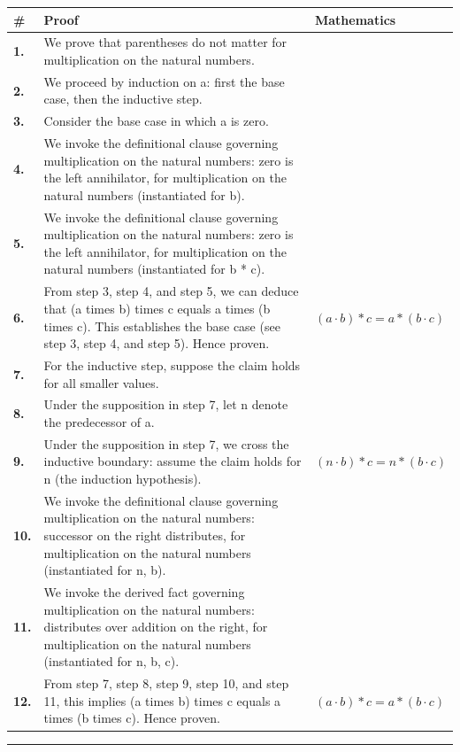 \documentclass[11pt]{article}
\theoremstyle{definition}
\begin{document}
\begin{tabular}{@{} >{\raggedright\arraybackslash}p{} >{\raggedright\arraybackslash}p{} >{\raggedleft\arraybackslash}p{} @{}}
\textbf{\#} & \textbf{Proof} & \textbf{Mathematics} \\
\midrule
\textbf{1.} & We prove that parentheses do not matter for multiplication on the natural numbers. & \\[0.45em]
\textbf{2.} & We proceed by induction on a: first the base case, then the inductive step. & \\[0.45em]
\textbf{3.} & Consider the base case in which a is zero. & \\[0.45em]
\textbf{4.} & We invoke the definitional clause governing multiplication on the natural numbers: zero is the left annihilator, for multiplication on the natural numbers (instantiated for b). & \\[0.45em]
\textbf{5.} & We invoke the definitional clause governing multiplication on the natural numbers: zero is the left annihilator, for multiplication on the natural numbers (instantiated for b * c). & \\[0.45em]
\textbf{6.} & From step 3, step 4, and step 5, we can deduce that (a times b) times c equals a times (b times c). This establishes the base case (see step 3, step 4, and step 5). Hence proven. & $\displaystyle (a \cdot b) * c = a * (b \cdot c)$ \\[0.45em]
\textbf{7.} & For the inductive step, suppose the claim holds for all smaller values. & \\[0.45em]
\textbf{8.} & Under the supposition in step 7, let n denote the predecessor of a. & \\[0.45em]
\textbf{9.} & Under the supposition in step 7, we cross the inductive boundary: assume the claim holds for n (the induction hypothesis). & $\displaystyle (n \cdot b) * c = n * (b \cdot c)$ \\[0.45em]
\textbf{10.} & We invoke the definitional clause governing multiplication on the natural numbers: successor on the right distributes, for multiplication on the natural numbers (instantiated for n, b). & \\[0.45em]
\textbf{11.} & We invoke the derived fact governing multiplication on the natural numbers: distributes over addition on the right, for multiplication on the natural numbers (instantiated for n, b, c). & \\[0.45em]
\textbf{12.} & From step 7, step 8, step 9, step 10, and step 11, this implies (a times b) times c equals a times (b times c). Hence proven. & $\displaystyle (a \cdot b) * c = a * (b \cdot c)$ \\[0.45em]
\bottomrule
\end{tabular}
\label{thm:Nat-multiplication-parentheses_do_not_matter}
\par\medskip\hrule
\end{document}
